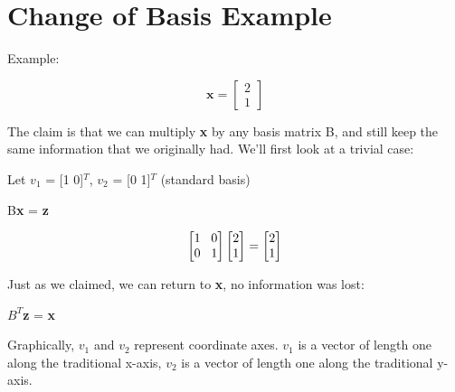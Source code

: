 \documentclass[11pt]{article}
\begin{document}
\section*{Change of Basis Example}


Example:\newline

\begin{center}
\[
\textbf{x} = 
\begin{bmatrix}
   2        \\
    1            
\end{bmatrix}
\]
\end{center}

 
The claim is that we can multiply \textbf{x} by any basis matrix B, and still keep the same information that we originally had. We'll first look at a trivial case:\newline

Let $v_1$ = [1 0]$^T$, $v_2$ = [0 1]$^T$  (standard basis)

\vspace{3mm}
\begin{center}

B\textbf{x} = \textbf{z}

\end{center}

\[
\begin{bmatrix}
   1 \hspace{3mm} 0       \\
   0 \hspace{3mm} 1            
\end{bmatrix}
\begin{bmatrix}
    2  \\
    1
\end{bmatrix}
= 
\begin{bmatrix}
    2  \\
    1
\end{bmatrix}
\]

\vspace{3mm}
Just as we claimed, we can return to \textbf{x}, no information was lost:


\begin{center}

$B^{T}$\textbf{z} = \textbf{x}

\end{center}

\vspace{7mm}
Graphically, $v_1$ and $v_2$ represent coordinate axes.  $v_1$ is a vector of length one along the traditional x-axis, $v_2$ is a vector of length one along the traditional y-axis.
\end{document}
